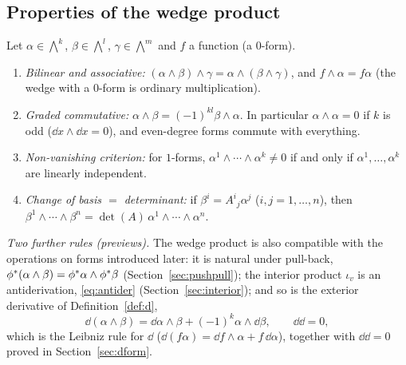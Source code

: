 \subsection{Properties of the wedge product}\label{sec:wedgeprops}

\begin{proposition}\label{prop:wedgeprops}
Let $\alpha\in\bigwedge^k$, $\beta\in\bigwedge^l$, $\gamma\in\bigwedge^m$ and $f$ a function (a $0$-form).
\begin{enumerate}[label=(\alph*)]
\item \emph{Bilinear and associative:} $(\alpha\wedge\beta)\wedge\gamma=\alpha\wedge(\beta\wedge\gamma)$, and $f\wedge\alpha=f\alpha$ (the wedge with a $0$-form is ordinary multiplication).
\item \emph{Graded commutative:} $\alpha\wedge\beta=(-1)^{kl}\beta\wedge\alpha$. In particular $\alpha\wedge\alpha=0$ if $k$ is odd (\eg $\dd x\wedge\dd x=0$), and even-degree forms commute with everything.
\item \emph{Non-vanishing criterion:} for $1$-forms, $\alpha^1\wedge\cdots\wedge\alpha^k\neq0$ if and only if $\alpha^1,\dots,\alpha^k$ are linearly independent.
\item \emph{Change of basis $=$ determinant:} if $\beta^i=A^i{}_j\alpha^j$ ($i,j=1,\dots,n$), then $\beta^1\wedge\cdots\wedge\beta^n=\det(A)\,\alpha^1\wedge\cdots\wedge\alpha^n$.
\end{enumerate}
\end{proposition}

\emph{Two further rules (previews).} The wedge product is also compatible with the operations on forms introduced later:
it is natural under pull-back, $\phi{}^{*}(\alpha\wedge\beta)=\phi{}^{*}\alpha\wedge\phi{}^{*}\beta$ (Section~\ref{sec:pushpull}); the interior
product $\iota_v$ is an antiderivation, \eqref{eq:antider} (Section~\ref{sec:interior}); and so is the exterior derivative of
Definition~\ref{def:d},
\begin{equation}\label{eq:dleibniz}
\dd(\alpha\wedge\beta)=\dd\alpha\wedge\beta+(-1)^k\alpha\wedge\dd\beta,\qquad \dd\dd=0,
\end{equation}
which is the Leibniz rule for $\dd$ (\eg $\dd(f\alpha)=\dd f\wedge\alpha+f\,\dd\alpha$), together with $\dd\dd=0$ proved in
Section~\ref{sec:dform}.

